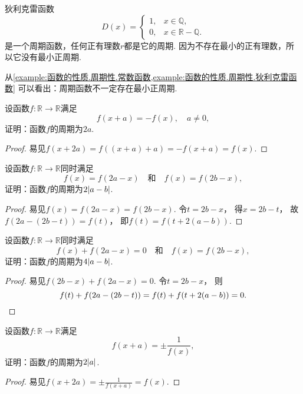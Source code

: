 \begin{example}\label{example:函数的性质.周期性.狄利克雷函数}
狄利克雷函数\begin{equation*}
	D(x) = \left\{ \begin{array}{ll}
		1, & x \in \mathbb{Q}, \\
		0, & x \in \mathbb{R}-\mathbb{Q}.
	\end{array} \right.
\end{equation*}是一个周期函数，任何正有理数\(r\)都是它的周期.
因为不存在最小的正有理数，所以它没有最小正周期.
\end{example}

\begin{remark}
从\cref{example:函数的性质.周期性.常数函数,example:函数的性质.周期性.狄利克雷函数}
可以看出：周期函数不一定存在最小正周期.
\end{remark}

\begin{example}
设函数\(f\colon\mathbb{R}\to\mathbb{R}\)满足\begin{equation*}
	f(x+a) = -f(x),
	\quad a\neq0,
\end{equation*}
证明：函数\(f\)的周期为\(2a\).
\begin{proof}
易见\(f(x+2a)
=f((x+a)+a)
=-f(x+a)
=f(x)\).
\end{proof}
\end{example}

\begin{example}
设函数\(f\colon\mathbb{R}\to\mathbb{R}\)同时满足\begin{equation*}
	f(x)=f(2a-x)
	\quad\text{和}\quad
	f(x)=f(2b-x),
\end{equation*}
证明：函数\(f\)的周期为\(2\abs{a-b}\).
\begin{proof}
易见\(f(x)
=f(2a-x)
=f(2b-x)\).
令\(t=2b-x\)，
得\(x=2b-t\)，
故\(f(2a-(2b-t))=f(t)\)，
即\(f(t)=f(t+2(a-b))\).
\end{proof}
\end{example}

\begin{example}
设函数\(f\colon\mathbb{R}\to\mathbb{R}\)同时满足\begin{equation*}
	f(x)+f(2a-x)=0
	\quad\text{和}\quad
	f(x)=f(2b-x),
\end{equation*}
证明：函数\(f\)的周期为\(4\abs{a-b}\).
\begin{proof}
易见\(f(2b-x)+f(2a-x)=0\).
令\(t=2b-x\)，
则\begin{equation*}
	f(t)+f(2a-(2b-t))
	=f(t)+f(t+2(a-b))
	=0.
	\qedhere
\end{equation*}
\end{proof}
\end{example}

\begin{example}
设函数\(f\colon\mathbb{R}\to\mathbb{R}\)满足\begin{equation*}
	f(x+a)=\pm\frac1{f(x)},
\end{equation*}
证明：函数\(f\)的周期为\(2\abs{a}\).
\begin{proof}
易见\(f(x+2a)=\pm\frac1{f(x+a)}=f(x)\).
\end{proof}
\end{example}
